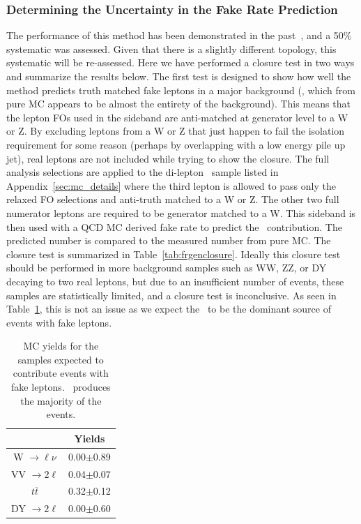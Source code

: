 \clearpage

\subsubsection{Determining the Uncertainty in the Fake Rate Prediction}
The performance of this method has been demonstrated in the past~\cite{sspaper2011}, and a 50\% systematic was assessed. Given that there is a slightly different topology, this systematic will be re-assessed. Here we have performed a closure test in two ways and summarize the results below. The first test is designed to show how well the method predicts truth matched fake leptons in a major background (\ttbar, which from pure MC appears to be almost the entirety of the background). This means that the lepton FOs used in the sideband are anti-matched at generator level to a W or Z. By excluding leptons from a W or Z that just happen to fail the isolation requirement for some reason (perhaps by overlapping with a low energy pile up jet), real leptons are not included while trying to show the closure. The full analysis selections are applied to the di-lepton \ttbar \ sample listed in Appendix~\ref{sec:mc_details} where the third lepton is allowed to pass only the relaxed FO selections and anti-truth matched to a W or Z. The other two full numerator leptons are required to be generator matched to a W. This sideband is then used with a QCD MC derived fake rate to predict the \ttbar \ contribution. The predicted number is compared to the measured number from pure MC. The closure test is summarized in Table~\ref{tab:frgenclosure}. Ideally this closure test should be performed in more background samples such as WW, ZZ, or DY decaying to two real leptons, but due to an insufficient number of events, these samples are statistically limited, and a closure test is inconclusive. As seen in Table~\ref{tab:fakeMCYields}, this is not an issue as we expect the \ttbar \ to be the dominant source of events with fake leptons.\\


\begin{table}[ht!]
\begin{center}

\begin{tabular}{c|c}\hline
&Yields\\
\hline \hline
W $\rightarrow \ell \nu$ &   0.00$\pm$0.89 \\
VV $\rightarrow 2 \ell$ &    0.04$\pm$0.07 \\
$t\overline{t}$     &        0.32$\pm$0.12 \\
DY $\rightarrow 2 \ell$  &   0.00$\pm$0.60 \\
\hline
\end{tabular}
\caption{ \label{tab:fakeMCYields} MC yields for the samples expected to contribute events with fake leptons. \ttbar \ produces the majority of the events.}
\end{center}
\end{table}


